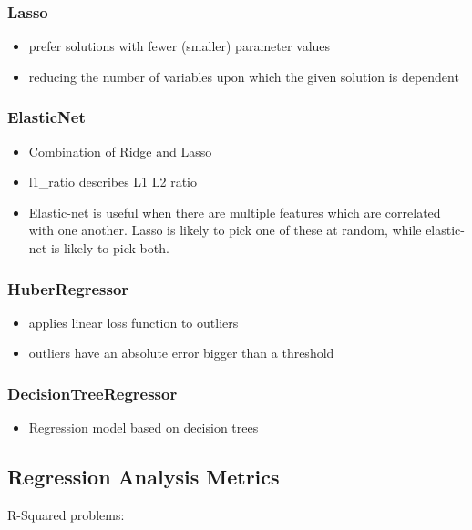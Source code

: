 \subsubsection{Lasso}
\begin{itemize}
	\item prefer solutions with fewer (smaller) parameter values
	\item reducing the number of variables upon which the given solution is dependent
\end{itemize}
\subsubsection{ElasticNet}
\begin{itemize}
	\item Combination of Ridge and Lasso
	\item l1\_ratio describes L1 L2 ratio
	\item Elastic-net is useful when there are multiple features which are correlated with one another. Lasso is likely to pick one of these at random, while elastic-net is likely to pick both.
\end{itemize}
\subsubsection{HuberRegressor}
\begin{itemize}
	\item applies linear loss function to outliers
	\item outliers have an absolute error bigger than a threshold
\end{itemize}
\subsubsection{DecisionTreeRegressor}
\begin{itemize}
	\item Regression model based on decision trees
\end{itemize}


\subsection{Regression Analysis Metrics}




R-Squared problems: 

